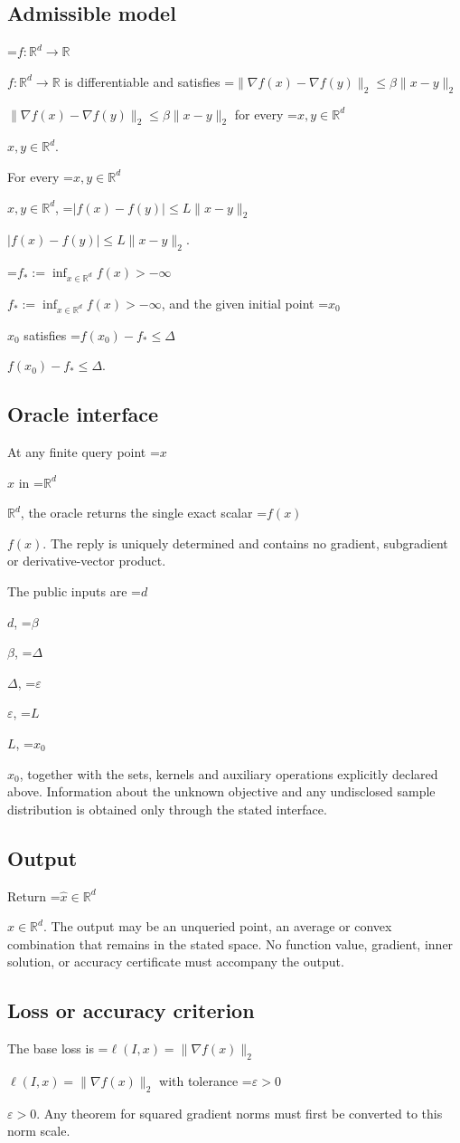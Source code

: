 \documentclass[10pt,a4paper]{article}
\newcommand{\AtlasMath}[1]{\par\begingroup\centering\setbox0=\hbox{$\displaystyle #1$}\ifdim\wd0>1.4\linewidth\typeout{ATLAS WIDE FORMULA: \the\wd0}\fi\ifdim\wd0>\linewidth\resizebox{\linewidth}{!}{\box0}\else\box0\fi\par\endgroup}
\newcommand{\AtlasInlineMath}[1]{\begingroup\setbox0=\hbox{$#1$}\ifdim\wd0>.4\linewidth\endgroup\AtlasMath{#1}\else\endgroup$#1$\fi}
\begin{document}
\subsection{Admissible model}
\AtlasInlineMath{f:\mathbb{R}^d\to\mathbb{R}} is differentiable and satisfies \AtlasInlineMath{\|\nabla f(x)-\nabla f(y)\|_2\le\beta\|x-y\|_2} for every \AtlasInlineMath{x,y\in\mathbb{R}^d}.

For every \AtlasInlineMath{x,y\in\mathbb{R}^d}, \AtlasInlineMath{|f(x)-f(y)|\le L\|x-y\|_2}.

\AtlasInlineMath{f_*:=\inf_{x\in\mathbb{R}^d}f(x)>-\infty}, and the given initial point \AtlasInlineMath{x_0} satisfies \AtlasInlineMath{f(x_0)-f_*\le\Delta}.

\subsection{Oracle interface}
At any finite query point \AtlasInlineMath{x} in \AtlasInlineMath{\mathbb{R}^d}, the oracle returns the single exact scalar \AtlasInlineMath{f(x)}. The reply is uniquely determined and contains no gradient, subgradient or derivative-vector product.

The public inputs are \AtlasInlineMath{d}, \AtlasInlineMath{\beta}, \AtlasInlineMath{\Delta}, \AtlasInlineMath{\varepsilon}, \AtlasInlineMath{L}, \AtlasInlineMath{x_0}, together with the sets, kernels and auxiliary operations explicitly declared above. Information about the unknown objective and any undisclosed sample distribution is obtained only through the stated interface.

\subsection{Output}
Return \AtlasInlineMath{\widehat{x}\in \mathbb{R}^d}. The output may be an unqueried point, an average or convex combination that remains in the stated space. No function value, gradient, inner solution, or accuracy certificate must accompany the output.

\subsection{Loss or accuracy criterion}
The base loss is \AtlasInlineMath{\ell(I,x)=\|\nabla f(x)\|_2} with tolerance \AtlasInlineMath{\varepsilon>0}. Any theorem for squared gradient norms must first be converted to this norm scale.
\end{document}
